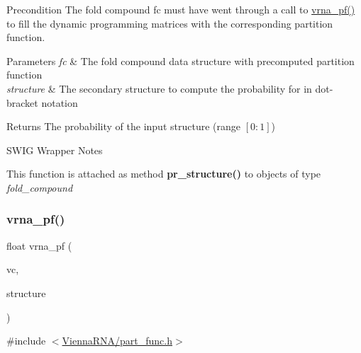 \begin{DoxyPrecond}{Precondition}
The fold compound {\ttfamily fc} must have went through a call to \mbox{\hyperlink{group__part__func__global_ga29e256d688ad221b78d37f427e0e99bc}{vrna\+\_\+pf()}} to fill the dynamic programming matrices with the corresponding partition function.
\end{DoxyPrecond}

\begin{DoxyParams}{Parameters}
{\em fc} & The fold compound data structure with precomputed partition function \\
\hline
{\em structure} & The secondary structure to compute the probability for in dot-\/bracket notation \\
\hline
\end{DoxyParams}
\begin{DoxyReturn}{Returns}
The probability of the input structure (range $[0:1]$)
\end{DoxyReturn}
\begin{DoxyRefDesc}{S\+W\+I\+G Wrapper Notes}
\item[\mbox{\hyperlink{wrappers__wrappers000114}{S\+W\+I\+G Wrapper Notes}}]This function is attached as method {\bfseries{pr\+\_\+structure()}} to objects of type {\itshape fold\+\_\+compound} \end{DoxyRefDesc}
\mbox{\label{group__part__func__global_ga29e256d688ad221b78d37f427e0e99bc}} 
\subsubsection{\texorpdfstring{vrna\_pf()}{vrna\_pf()}}
{\footnotesize\ttfamily float vrna\+\_\+pf (\begin{DoxyParamCaption}\item[{\mbox{\hyperlink{group__fold__compound_ga1b0cef17fd40466cef5968eaeeff6166}{vrna\+\_\+fold\+\_\+compound\+\_\+t}} $\ast$}]{vc,  }\item[{char $\ast$}]{structure }\end{DoxyParamCaption})}



{\ttfamily \#include $<$\mbox{\hyperlink{part__func_8h}{Vienna\+R\+N\+A/part\+\_\+func.\+h}}$>$}



